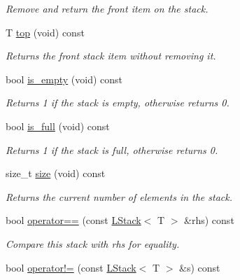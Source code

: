 \begin{DoxyCompactItemize}
\begin{DoxyCompactList}\small\item\em Remove and return the front item on the stack. \item\end{DoxyCompactList}\item 
T \hyperlink{classMadara_1_1Utility_1_1LStack_a988c96b8c9de5b4418f7c04362931f8a}{top} (void) const 
\begin{DoxyCompactList}\small\item\em Returns the front stack item without removing it. \item\end{DoxyCompactList}\item 
bool \hyperlink{classMadara_1_1Utility_1_1LStack_afa2e177fb871582918485b3f41c8dc3f}{is\_\-empty} (void) const 
\begin{DoxyCompactList}\small\item\em Returns 1 if the stack is empty, otherwise returns 0. \item\end{DoxyCompactList}\item 
bool \hyperlink{classMadara_1_1Utility_1_1LStack_a5985c11f2c0cfe8bc5aab588a2d270bc}{is\_\-full} (void) const 
\begin{DoxyCompactList}\small\item\em Returns 1 if the stack is full, otherwise returns 0. \item\end{DoxyCompactList}\item 
size\_\-t \hyperlink{classMadara_1_1Utility_1_1LStack_a3f681865a22f59aa35b8d0614332a7db}{size} (void) const 
\begin{DoxyCompactList}\small\item\em Returns the current number of elements in the stack. \item\end{DoxyCompactList}\item 
bool \hyperlink{classMadara_1_1Utility_1_1LStack_a9c7597aa000db25d447b9af32c6a4299}{operator==} (const \hyperlink{classMadara_1_1Utility_1_1LStack}{LStack}$<$ T $>$ \&rhs) const 
\begin{DoxyCompactList}\small\item\em Compare this stack with {\itshape rhs\/} for equality. \item\end{DoxyCompactList}\item 
bool \hyperlink{classMadara_1_1Utility_1_1LStack_ae4c6cbcaf7707165680a64e34067da5c}{operator!=} (const \hyperlink{classMadara_1_1Utility_1_1LStack}{LStack}$<$ T $>$ \&s) const 

\end{DoxyCompactItemize}
